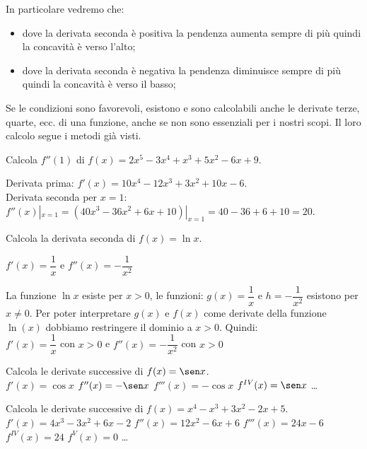 In particolare vedremo che:
\begin{itemize} [nosep]
\item 
dove la derivata seconda è positiva la pendenza aumenta sempre di più 
quindi la concavità è verso l'alto;
\item 
dove la derivata seconda è negativa la pendenza diminuisce sempre di più 
quindi la concavità è verso il basso;
\end{itemize}

Se le condizioni sono favorevoli, esistono e sono calcolabili anche le 
derivate terze, quarte, ecc. di una funzione, anche se non sono essenziali 
per i nostri scopi. Il loro calcolo segue i metodi già visti.

\begin{esempio}
Calcola \(f''(1)\) di \(f(x)=2x^5-3x^4+x^3+5x^2-6x+9\).

\noindent Derivata prima: \quad 
\(f'(x)=10 x^4-12 x^3+3x^2+10 x-6\).\\
Derivata seconda per \(x=1\): \quad 
\(f''(x)|_{x=1} = (40x^3-36x^2+6x+10)|_{x=1}=40-36+6+10=20\).
\end{esempio}

\begin{esempio}
Calcola la derivata seconda di \(f(x)=\ln x\).

\(f'(x)=\dfrac{1}{x}\) \quad e \quad \(f''(x)=-\dfrac{1}{x^2}\)
\begin{osservazione}
La funzione \(\ln x\) esiste per \(x>0\), le funzioni:
\(g(x)=\dfrac{1}{x}\) e \(h=-\dfrac{1}{x^2}\) esistono per \(x\ne 0\).
Per poter interpretare \(g(x)\) e \(f(x)\) come derivate della funzione 
\(\ln(x)\) dobbiamo restringere il dominio a \(x > 0\). 
Quindi:\\
\(f'(x)=\dfrac{1}{x} \) con \(x > 0\) \quad e \quad 
\(f''(x)=-\dfrac{1}{x^2}\) con \(x > 0\) 
\end{osservazione}
\end{esempio}

\begin{esempio}
Calcola le derivate successive di \(f(x)=\sen x\).\\[4pt]
\(f'(x)=\cos x\) \hspace{1cm}  \(f''(x)=-\sen x\) \hspace{1cm}
\(f'''(x)=-\cos x\) \hspace{1cm} \(f^{IV}(x)=\sen x\) \dots
\end{esempio}

\begin{esempio}
Calcola le derivate successive di \(f(x)=x^4 -x^3 +3x^2 -2x +5\).\\[4pt]
\(f'(x) = 4x^3 -3x^2 +6x -2\) \quad 
\(f''(x) = 12x^2 -6x +6\) \quad 
\(f'''(x) = 24x -6\) \\ 
\(f^{IV}(x) = 24\) \quad 
\(f^{V}(x) = 0\) \dots
\end{esempio}




